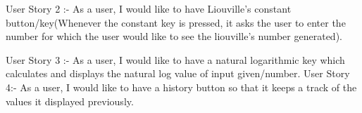 \documentclass[12pt]{article}
\begin{document}
User Story 2 :- As a user, I would like to have Liouville's constant button/key(Whenever the constant key is pressed, it asks the user to enter the number for which the user would like to see the liouville's number generated).
\newline
\newline
\newline

User Story 3 :- As a user, I would like to have a natural logarithmic key which calculates and displays the natural log value of input given/number.
\newline
\newline
\newline
User Story 4:- As a user, I would like to have a history button so that it keeps a track of the values it displayed previously.
\end{document}
